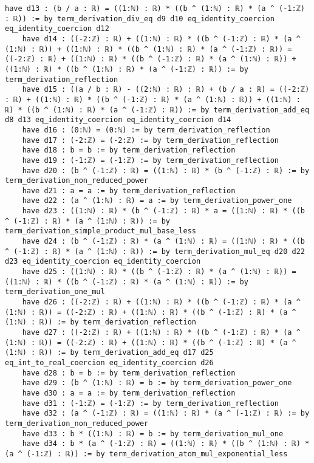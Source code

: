 \documentclass{article}
\begin{document}
\begin{tcolorbox}[colback=white!10, width=\linewidth]
\begin{lstlisting}[language=Lean4]
    have d13 : (b / a : ℝ) = ((1:ℕ) : ℝ) * ((b ^ (1:ℕ) : ℝ) * (a ^ (-1:ℤ) : ℝ)) := by term_derivation_div_eq d9 d10 eq_identity_coercion eq_identity_coercion d12
    have d14 : ((-2:ℤ) : ℝ) + ((1:ℕ) : ℝ) * ((b ^ (-1:ℤ) : ℝ) * (a ^ (1:ℕ) : ℝ)) + ((1:ℕ) : ℝ) * ((b ^ (1:ℕ) : ℝ) * (a ^ (-1:ℤ) : ℝ)) = ((-2:ℤ) : ℝ) + ((1:ℕ) : ℝ) * ((b ^ (-1:ℤ) : ℝ) * (a ^ (1:ℕ) : ℝ)) + ((1:ℕ) : ℝ) * ((b ^ (1:ℕ) : ℝ) * (a ^ (-1:ℤ) : ℝ)) := by term_derivation_reflection
    have d15 : ((a / b : ℝ) - ((2:ℕ) : ℝ) : ℝ) + (b / a : ℝ) = ((-2:ℤ) : ℝ) + ((1:ℕ) : ℝ) * ((b ^ (-1:ℤ) : ℝ) * (a ^ (1:ℕ) : ℝ)) + ((1:ℕ) : ℝ) * ((b ^ (1:ℕ) : ℝ) * (a ^ (-1:ℤ) : ℝ)) := by term_derivation_add_eq d8 d13 eq_identity_coercion eq_identity_coercion d14
    have d16 : (0:ℕ) = (0:ℕ) := by term_derivation_reflection
    have d17 : (-2:ℤ) = (-2:ℤ) := by term_derivation_reflection
    have d18 : b = b := by term_derivation_reflection
    have d19 : (-1:ℤ) = (-1:ℤ) := by term_derivation_reflection
    have d20 : (b ^ (-1:ℤ) : ℝ) = ((1:ℕ) : ℝ) * (b ^ (-1:ℤ) : ℝ) := by term_derivation_non_reduced_power
    have d21 : a = a := by term_derivation_reflection
    have d22 : (a ^ (1:ℕ) : ℝ) = a := by term_derivation_power_one
    have d23 : ((1:ℕ) : ℝ) * (b ^ (-1:ℤ) : ℝ) * a = ((1:ℕ) : ℝ) * ((b ^ (-1:ℤ) : ℝ) * (a ^ (1:ℕ) : ℝ)) := by term_derivation_simple_product_mul_base_less
    have d24 : (b ^ (-1:ℤ) : ℝ) * (a ^ (1:ℕ) : ℝ) = ((1:ℕ) : ℝ) * ((b ^ (-1:ℤ) : ℝ) * (a ^ (1:ℕ) : ℝ)) := by term_derivation_mul_eq d20 d22 d23 eq_identity_coercion eq_identity_coercion
    have d25 : ((1:ℕ) : ℝ) * ((b ^ (-1:ℤ) : ℝ) * (a ^ (1:ℕ) : ℝ)) = ((1:ℕ) : ℝ) * ((b ^ (-1:ℤ) : ℝ) * (a ^ (1:ℕ) : ℝ)) := by term_derivation_one_mul
    have d26 : ((-2:ℤ) : ℝ) + ((1:ℕ) : ℝ) * ((b ^ (-1:ℤ) : ℝ) * (a ^ (1:ℕ) : ℝ)) = ((-2:ℤ) : ℝ) + ((1:ℕ) : ℝ) * ((b ^ (-1:ℤ) : ℝ) * (a ^ (1:ℕ) : ℝ)) := by term_derivation_reflection
    have d27 : ((-2:ℤ) : ℝ) + ((1:ℕ) : ℝ) * ((b ^ (-1:ℤ) : ℝ) * (a ^ (1:ℕ) : ℝ)) = ((-2:ℤ) : ℝ) + ((1:ℕ) : ℝ) * ((b ^ (-1:ℤ) : ℝ) * (a ^ (1:ℕ) : ℝ)) := by term_derivation_add_eq d17 d25 eq_int_to_real_coercion eq_identity_coercion d26
    have d28 : b = b := by term_derivation_reflection
    have d29 : (b ^ (1:ℕ) : ℝ) = b := by term_derivation_power_one
    have d30 : a = a := by term_derivation_reflection
    have d31 : (-1:ℤ) = (-1:ℤ) := by term_derivation_reflection
    have d32 : (a ^ (-1:ℤ) : ℝ) = ((1:ℕ) : ℝ) * (a ^ (-1:ℤ) : ℝ) := by term_derivation_non_reduced_power
    have d33 : b * ((1:ℕ) : ℝ) = b := by term_derivation_mul_one
    have d34 : b * (a ^ (-1:ℤ) : ℝ) = ((1:ℕ) : ℝ) * ((b ^ (1:ℕ) : ℝ) * (a ^ (-1:ℤ) : ℝ)) := by term_derivation_atom_mul_exponential_less

\end{lstlisting}
\end{tcolorbox}
\end{document}
